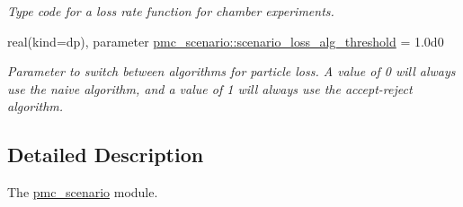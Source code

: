 \begin{DoxyCompactItemize}
\begin{DoxyCompactList}\small\item\em Type code for a loss rate function for chamber experiments. \end{DoxyCompactList}\item 
real(kind=dp), parameter \mbox{\hyperlink{namespacepmc__scenario_a9a75d68d9d307fb489fed7ff06735c39}{pmc\+\_\+scenario\+::scenario\+\_\+loss\+\_\+alg\+\_\+threshold}} = 1.\+0d0
\begin{DoxyCompactList}\small\item\em Parameter to switch between algorithms for particle loss. A value of 0 will always use the naive algorithm, and a value of 1 will always use the accept-\/reject algorithm. \end{DoxyCompactList}\end{DoxyCompactItemize}


\subsection{Detailed Description}
The \mbox{\hyperlink{namespacepmc__scenario}{pmc\+\_\+scenario}} module. 

